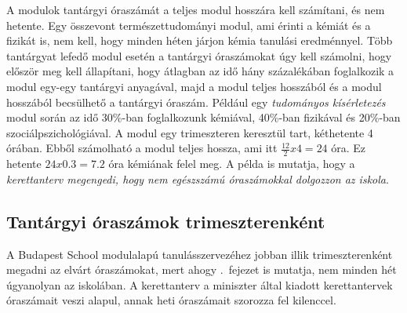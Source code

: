 A modulok tantárgyi óraszámát a teljes modul hosszára kell számítani, és nem hetente. Egy összevont természettudományi modul, ami érinti a kémiát és a fizikát is, nem kell, hogy minden héten járjon kémia tanulási eredménnyel. Több tantárgyat lefedő modul esetén a tantárgyi óraszámokat úgy kell számolni, hogy először meg kell állapítani, hogy átlagban az idő hány százalékában foglalkozik a modul egy-egy tantárgyi anyagával, majd a modul teljes hosszából és a modul hosszából becsülhető a tantárgyi óraszám. Például egy \emph{tudományos kísérletezés} modul során az idő 30\%-ban foglalkozunk kémiával, 40\%-ban fizikával és 20\%-ban szociálpszichológiával. A modul egy trimeszteren keresztül tart, kéthetente 4 órában. Ebből számolható a modul teljes hossza, ami itt $\frac{12}{2}x4 = 24$ óra. Ez hetente $24x0.3 = 7.2$ óra kémiának felel meg. 
A példa is mutatja, hogy a \emph{kerettanterv megengedi, hogy nem egészszámú óraszámokkal dolgozzon az iskola}. 

\subsection{Tantárgyi óraszámok trimeszterenként}
A Budapest School modulalapú tanulásszervezéhez jobban illik trimeszterenként megadni az elvárt óraszámokat, mert ahogy .~fejezet is mutatja, nem minden hét úgyanolyan az iskolában. A kerettanterv a miniszter által kiadott kerettantervek óraszámait veszi alapul, annak heti óraszámait szorozza fel kilenccel. 

